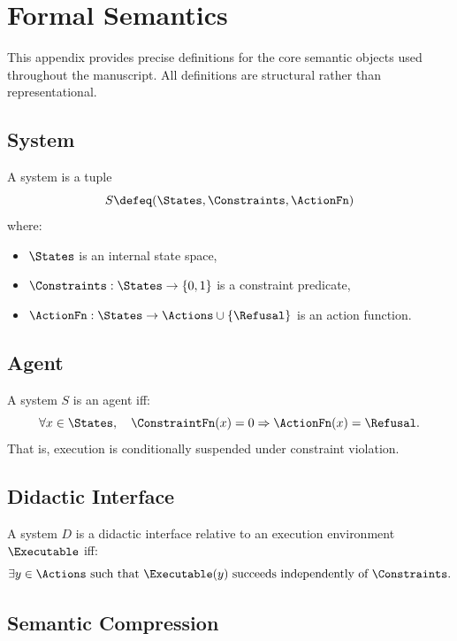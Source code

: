 \section{Formal Semantics}

This appendix provides precise definitions for the core semantic objects used throughout the manuscript. All definitions are structural rather than representational.

\subsection{System}

\begin{definition}[System]
A system is a tuple
\[
S \defeq (\States, \Constraints, \ActionFn)
\]
where:
\begin{itemize}
  \item $\States$ is an internal state space,
  \item $\Constraints : \States \to \{0,1\}$ is a constraint predicate,
  \item $\ActionFn : \States \to \Actions \cup \{\Refusal\}$ is an action function.
\end{itemize}
\end{definition}

\subsection{Agent}

\begin{definition}[Agent]
A system $S$ is an agent iff:
\[
\forall x \in \States,\quad \ConstraintFn(x) = 0 \Rightarrow \ActionFn(x) = \Refusal.
\]
That is, execution is conditionally suspended under constraint violation.
\end{definition}

\subsection{Didactic Interface}

\begin{definition}
A system $D$ is a didactic interface relative to an execution environment $\Executable$ iff:
\[
\exists y \in \Actions \text{ such that } \Executable(y) \text{ succeeds independently of } \Constraints.
\]
\end{definition}

\subsection{Semantic Compression}

